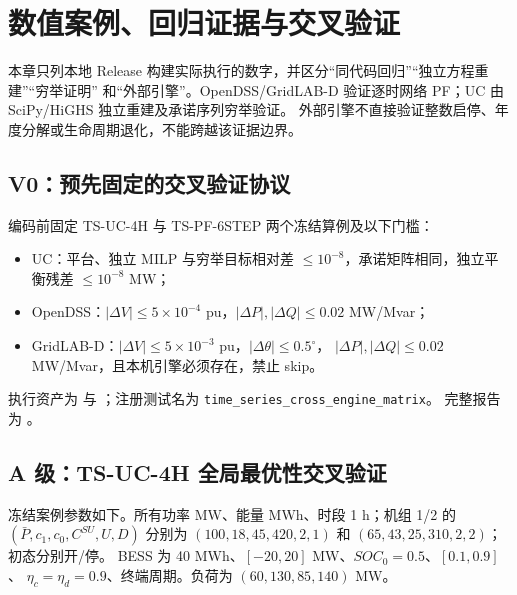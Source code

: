 \section{数值案例、回归证据与交叉验证}
\label{sec:ts-validation}

本章只列本地 Release 构建实际执行的数字，并区分“同代码回归”“独立方程重建”“穷举证明”
和“外部引擎”。OpenDSS/GridLAB-D 验证逐时网络 PF；UC 由 SciPy/HiGHS 独立重建及承诺序列穷举验证。
外部引擎不直接验证整数启停、年度分解或生命周期退化，不能跨越该证据边界。

\subsection{V0：预先固定的交叉验证协议}
编码前固定 TS-UC-4H 与 TS-PF-6STEP 两个冻结算例及以下门槛：
\begin{itemize}
  \item UC：平台、独立 MILP 与穷举目标相对差 $\le10^{-8}$，承诺矩阵相同，独立平衡残差 $\le10^{-8}$ MW；
  \item OpenDSS：$|\Delta V|\le5\times10^{-4}$ pu，$|\Delta P|,|\Delta Q|\le0.02$ MW/Mvar；
  \item GridLAB-D：$|\Delta V|\le5\times10^{-3}$ pu，$|\Delta\theta|\le0.5^\circ$，
        $|\Delta P|,|\Delta Q|\le0.02$ MW/Mvar，且本机引擎必须存在，禁止 skip。
\end{itemize}
执行资产为  与
；注册测试名为 \texttt{time\_series\_cross\_engine\_matrix}。
完整报告为 。

\subsection{A 级：TS-UC-4H 全局最优性交叉验证}
冻结案例参数如下。所有功率 MW、能量 MWh、时段 1 h；机组 1/2 的
$(\bar P,c_1,c_0,C^{SU},U,D)$ 分别为
$(100,18,45,420,2,1)$ 和 $(65,43,25,310,2,2)$；初态分别开/停。
BESS 为 40 MWh、$[-20,20]$ MW、$SOC_0=0.5$、$[0.1,0.9]$、
$\eta_c=\eta_d=0.9$、终端周期。负荷为 $(60,130,85,140)$ MW。

